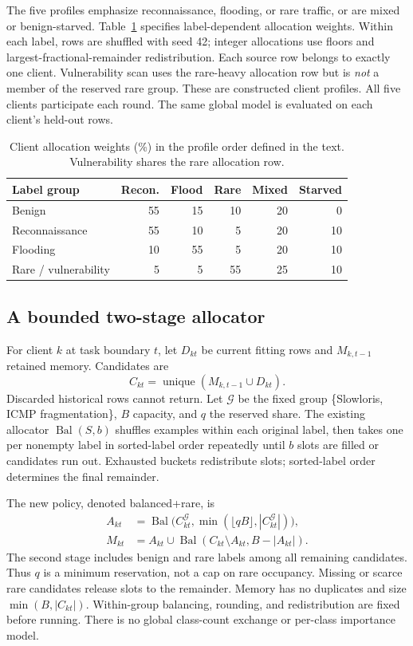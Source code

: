 \documentclass[journal,10pt]{IEEEtran}
\newcommand{\BR}{balanced+rare}
\begin{document}
The five profiles emphasize reconnaissance, flooding, or rare traffic, or are mixed or benign-starved. Table~\ref{tab:allocation} specifies label-dependent allocation weights. Within each label, rows are shuffled with seed 42; integer allocations use floors and largest-fractional-remainder redistribution. Each source row belongs to exactly one client. Vulnerability scan uses the rare-heavy allocation row but is \emph{not} a member of the reserved rare group. These are constructed client profiles. All five clients participate each round. The same global model is evaluated on each client's held-out rows.

\begin{table}[t]
\centering
\caption{Client allocation weights (\%) in the profile order defined in the text. Vulnerability shares the rare allocation row.}
\label{tab:allocation}
\footnotesize
\begin{tabular}{lrrrrr}
\toprule
Label group & Recon. & Flood & Rare & Mixed & Starved\\
\midrule
Benign &55&15&10&20&0\\
Reconnaissance &55&10&5&20&10\\
Flooding &10&55&5&20&10\\
Rare / vulnerability &5&5&55&25&10\\
\bottomrule
\end{tabular}
\end{table}

\subsection{A bounded two-stage allocator}
For client $k$ at task boundary $t$, let $D_{kt}$ be current fitting rows and $M_{k,t-1}$ retained memory. Candidates are
\begin{equation}
C_{kt}=\operatorname{unique}(M_{k,t-1}\cup D_{kt}).
\end{equation}
Discarded historical rows cannot return. Let $\mathcal G$ be the fixed group \{Slowloris, ICMP fragmentation\}, $B$ capacity, and $q$ the reserved share. The existing allocator $\operatorname{Bal}(S,b)$ shuffles examples within each original label, then takes one per nonempty label in sorted-label order repeatedly until $b$ slots are filled or candidates run out. Exhausted buckets redistribute slots; sorted-label order determines the final remainder.

The new policy, denoted \BR, is
\begin{align}
A_{kt}&=\operatorname{Bal}\big(C_{kt}^{\mathcal G},
\min(\lfloor qB\rfloor,|C_{kt}^{\mathcal G}|)\big),\\
M_{kt}&=A_{kt}\cup\operatorname{Bal}(C_{kt}\setminus A_{kt},B-|A_{kt}|).
\end{align}
The second stage includes benign and rare labels among all remaining candidates. Thus $q$ is a minimum reservation, not a cap on rare occupancy. Missing or scarce rare candidates release slots to the remainder. Memory has no duplicates and size $\min(B,|C_{kt}|)$. Within-group balancing, rounding, and redistribution are fixed before running. There is no global class-count exchange or per-class importance model.
\end{document}
